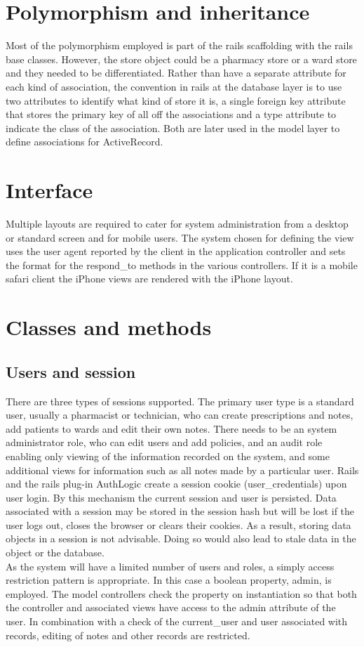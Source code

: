 \documentclass[letterpaper]{amsart}
\begin{document}
\section{Polymorphism and inheritance}
Most of the polymorphism employed is part of the rails scaffolding with the rails base classes.  However, the store object could be a pharmacy store or a ward store and they needed to be differentiated.  Rather than have a separate attribute for each kind of association, the convention in rails at the database layer is to use two attributes to identify what kind of store it is, a single foreign key attribute that stores the primary key of all off the associations and a type attribute to indicate the class of the association.  Both are later used in the model layer to define associations for ActiveRecord.
\section{Interface}
Multiple layouts are required to cater for system administration from a desktop or standard screen and for mobile users.  The system chosen for defining the view uses the user agent reported by the client in the application controller and sets the format for the respond\_to methods in the various controllers.  If it is a mobile safari client the iPhone views are rendered with the iPhone layout.  
\section{Classes and methods}
\subsection{Users and session} 
There are three types of sessions supported.  The primary user type is a standard user, usually a pharmacist or technician, who can create prescriptions and notes, add patients to wards and edit their own notes.  There needs to be an system administrator role, who can edit users and add policies, and an audit role enabling only viewing of the information recorded on the system, and some additional views for information such as all notes made by a particular user.
Rails and the rails plug-in AuthLogic create a session cookie (user\_credentials) upon user login.  By this mechanism the current session and user is persisted.  Data associated with a session may be stored in the session hash but will be lost if the user logs out, closes the browser or clears their cookies.  As a result, storing data objects in a session is not advisable.  Doing so would also lead to stale data in the object or the database.\\
As the system will have a limited number of users and roles, a simply access restriction pattern is appropriate.  In this case a boolean property, admin, is employed.  The model controllers check the property on instantiation so that both the controller and associated views have access to the admin attribute of the user.  In combination with a check of the current\_user and user associated with records, editing of notes and other records are restricted.
\end{document}
